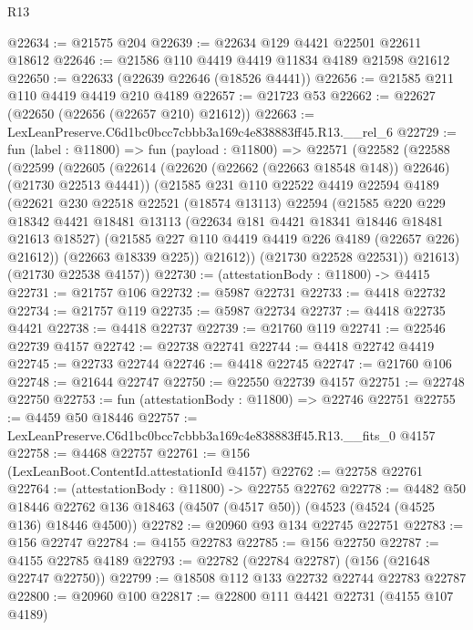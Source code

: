 \begin{lexlean}{R13}
\begin{coremodule}
@22634 := @21575 @204
@22639 := @22634 @129 @4421 @22501 @22611 @18612
@22646 := @21586 @110 @4419 @4419 @11834 @4189 @21598 @21612
@22650 := @22633 (@22639 @22646 (@18526 @4441))
@22656 := @21585 @211 @110 @4419 @4419 @210 @4189
@22657 := @21723 @53
@22662 := @22627 (@22650 (@22656 (@22657 @210) @21612))
@22663 := LexLeanPreserve.C6d1bc0bcc7cbbb3a169c4e838883ff45.R13.__rel_6
@22729 := fun (label : @11800) =>
  fun (payload : @11800) =>
  @22571
    (@22582
      (@22588
        (@22599
          (@22605
            (@22614 (@22620 (@22662 (@22663 @18548 @148)) @22646) (@21730 @22513 @4441))
            (@21585
              @231
              @110
              @22522
              @4419
              @22594
              @4189
              (@22621
                @230
                @22518
                @22521
                (@18574 @13113)
                @22594
                (@21585
                  @220
                  @229
                  @18342
                  @4421
                  @18481
                  @13113
                  (@22634 @181 @4421 @18341 @18446 @18481 @21613 @18527)
                  (@21585 @227 @110 @4419 @4419 @226 @4189 (@22657 @226) @21612))
                (@22663 @18339 @225))
              @21612))
          (@21730 @22528 @22531))
        @21613)
      (@21730 @22538 @4157))
@22730 := (attestationBody : @11800) -> @4415
@22731 := @21757 @106
@22732 := @5987 @22731
@22733 := @4418 @22732
@22734 := @21757 @119
@22735 := @5987 @22734
@22737 := @4418 @22735 @4421
@22738 := @4418 @22737
@22739 := @21760 @119
@22741 := @22546 @22739 @4157
@22742 := @22738 @22741
@22744 := @4418 @22742 @4419
@22745 := @22733 @22744
@22746 := @4418 @22745
@22747 := @21760 @106
@22748 := @21644 @22747
@22750 := @22550 @22739 @4157
@22751 := @22748 @22750
@22753 := fun (attestationBody : @11800) => @22746 @22751
@22755 := @4459 @50 @18446
@22757 := LexLeanPreserve.C6d1bc0bcc7cbbb3a169c4e838883ff45.R13.__fits_0 @4157
@22758 := @4468 @22757
@22761 := @156 (LexLeanBoot.ContentId.attestationId @4157)
@22762 := @22758 @22761
@22764 := (attestationBody : @11800) -> @22755 @22762
@22778 := @4482
    @50
    @18446
    @22762
    @136
    @18463
    (@4507 (@4517 @50))
    (@4523 (@4524 (@4525 @136) @18446 @4500))
@22782 := @20960 @93 @134 @22745 @22751
@22783 := @156 @22747
@22784 := @4155 @22783
@22785 := @156 @22750
@22787 := @4155 @22785 @4189
@22793 := @22782 (@22784 @22787) (@156 (@21648 @22747 @22750))
@22799 := @18508 @112 @133 @22732 @22744 @22783 @22787
@22800 := @20960 @100
@22817 := @22800
    @111
    @4421
    @22731
    (@4155 @107 @4189)

\end{coremodule}
\end{lexlean}
